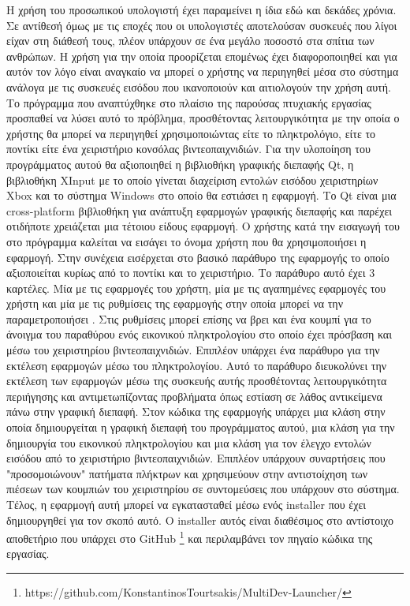 




Η χρήση του προσωπικού υπολογιστή έχει παραμείνει η ίδια εδώ και δεκάδες χρόνια.
Σε αντίθεσή όμως με τις εποχές που οι υπολογιστές αποτελούσαν συσκευές που λίγοι
είχαν στη διάθεσή τους, πλέον υπάρχουν σε ένα μεγάλο ποσοστό στα σπίτια των
ανθρώπων. Η χρήση για την οποία προορίζεται επομένως έχει διαφοροποιηθεί και
για αυτόν τον λόγο είναι αναγκαίο να μπορεί ο χρήστης να περιηγηθεί μέσα στο σύστημα
ανάλογα με τις συσκευές εισόδου που ικανοποιούν και αιτιολογούν την χρήση αυτή.
Το πρόγραμμα που αναπτύχθηκε στο πλαίσιο της παρούσας πτυχιακής εργασίας 
προσπαθεί να λύσει αυτό το πρόβλημα, προσθέτοντας λειτουργικότητα
με την οποία ο χρήστης θα μπορεί να περιηγηθεί χρησιμοποιώντας είτε το πληκτρολόγιο,
είτε το ποντίκι είτε ένα χειριστήριο κονσόλας βιντεοπαιχνιδιών. Για την υλοποίηση του
προγράμματος αυτού θα αξιοποιηθεί η βιβλιοθήκη γραφικής διεπαφής Qt, η βιβλιοθήκη
XInput με το οποίο γίνεται διαχείριση εντολών εισόδου χειριστηρίων Xbox και το
σύστημα Windows στο οποίο θα εστιάσει η εφαρμογή. Το Qt είναι μια cross-platform βιβλιοθήκη
για ανάπτυξη εφαρμογών γραφικής διεπαφής και παρέχει οτιδήποτε χρειάζεται μια τέτοιου είδους εφαρμογή. Ο χρήστης κατά την εισαγωγή του
στο πρόγραμμα καλείται να εισάγει το όνομα χρήστη που θα χρησιμοποιήσει η εφαρμογή.
Στην συνέχεια εισέρχεται στο βασικό παράθυρο της εφαρμογής το οποίο αξιοποιείται κυρίως
από το ποντίκι και  το χειριστήριο. Το παράθυρο αυτό έχει 3 καρτέλες. Μία με τις εφαρμογές
του χρήστη, μία με τις αγαπημένες εφαρμογές του χρήστη και μία με τις ρυθμίσεις της εφαρμογής
στην οποία μπορεί να την παραμετροποιήσει . Στις ρυθμίσεις μπορεί επίσης να βρει και ένα
κουμπί για το άνοιγμα του παραθύρου ενός εικονικού πληκτρολογίου στο οποίο έχει πρόσβαση και
μέσω του χειριστηρίου βιντεοπαιχνιδιών. Επιπλέον υπάρχει ένα παράθυρο για την εκτέλεση 
εφαρμογών μέσω του πληκτρολογίου. Αυτό το παράθυρο διευκολύνει την εκτέλεση των εφαρμογών μέσω της
συσκευής αυτής προσθέτοντας λειτουργικότητα περιήγησης και αντιμετωπίζοντας προβλήματα
όπως εστίαση σε λάθος αντικείμενα πάνω στην γραφική διεπαφή. Στον κώδικα της εφαρμογής υπάρχει
μια κλάση στην οποία δημιουργείται η γραφική διεπαφή του προγράμματος αυτού, μια κλάση για την
δημιουργία του εικονικού πληκτρολογίου και μια κλάση για τον έλεγχο εντολών εισόδου από το
χειριστήριο βιντεοπαιχνιδιών. Επιπλέον υπάρχουν συναρτήσεις που "προσομοιώνουν" πατήματα πλήκτρων
και χρησιμεύουν στην αντιστοίχηση των πιέσεων των κουμπιών του χειριστηρίου σε συντομεύσεις που
υπάρχουν στο σύστημα. Τέλος, η εφαρμογή αυτή μπορεί να εγκατασταθεί μέσω ενός installer που έχει
δημιουργηθεί για τον σκοπό αυτό. Ο installer αυτός είναι διαθέσιμος στο αντίστοιχο αποθετήριο που
υπάρχει στο GitHub \footnote{https://github.com/KonstantinosTourtsakis/MultiDev-Launcher/} και περιλαμβάνει τον πηγαίο κώδικα της εργασίας.


